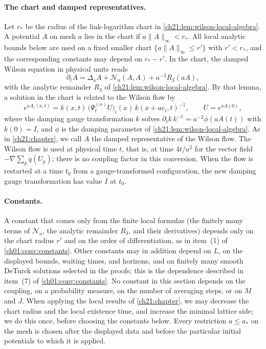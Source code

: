 \paragraph{The chart and damped representatives.}
Let $r_*$ be the radius of the link-logarithm chart in \cref{ch21:lem:wilson-local-algebra}. A potential $A$ on mesh $a$ lies in the chart if $a\|A\|_\infty<r_*$. All local analytic bounds below are used on a fixed smaller chart $\{a\|A\|_\infty\le r'\}$ with $r'<r_*$, and the corresponding constants may depend on $r_*-r'$. In the chart, the damped Wilson equation in physical units reads
\[
 \partial_tA=\Delta_aA+\mathcal N_a(A,A)+a^{-3}R_3(aA),
\]
with the analytic remainder $R_3$ of \cref{ch21:lem:wilson-local-algebra}. By that lemma, a solution in the chart is related to the Wilson flow by
\[
 e^{aA_i(x,t)}=k(x,t)\,\bigl(\Psi_t^{(n)}U\bigr)_i(x)\,k(x+ae_i,t)^{-1},\qquad U=e^{aA(0)},
\]
where the damping gauge transformation $k$ solves $\partial_tk\,k^{-1}=a^{-2}\phi(aA(t))$ with $k(0)=I$, and $\phi$ is the damping parameter of \cref{ch21:lem:wilson-local-algebra}. As in \cref{ch21:chapter}, we call $A$ the damped representative of the Wilson flow. The Wilson flow is used at physical time $t$, that is, at time $4t/a^2$ for the vector field $-\nabla\sum_pq(U_p)$; there is no coupling factor in this conversion. When the flow is restarted at a time $t_0$ from a gauge-transformed configuration, the new damping gauge transformation has value $I$ at $t_0$.

\paragraph{Constants.}
A constant that comes only from the finite local formulas (the finitely many terms of $\mathcal N_a$, the analytic remainder $R_3$, and their derivatives) depends only on the chart radius $r'$ and on the order of differentiation, as in item~(1) of \cref{ch01:conv:constants}. Other constants may in addition depend on $L$, on the displayed bounds, waiting times, and horizons, and on finitely many smooth DeTurck solutions selected in the proofs; this is the dependence described in item~(7) of \cref{ch01:conv:constants}. No constant in this section depends on the coupling, on a probability measure, on the number of averaging steps, or on $M$ and $J$. When applying the local results of \cref{ch21:chapter}, we may decrease the chart radius and the local existence time, and increase the minimal lattice side; we do this once, before choosing the constants below. Every restriction $a\le a_*$ on the mesh is chosen after the displayed data and before the particular initial potentials to which it is applied.

